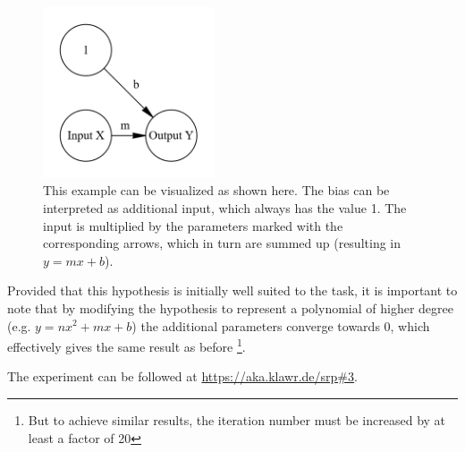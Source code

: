 \begin{figure}
    \centering
    \caption{This example can be visualized as shown here. The bias can be interpreted as additional input, which always has the value 1. The input is multiplied by the parameters marked with the corresponding arrows, which in turn are summed up (resulting in $y = mx + b$).}
    \includegraphics[width=0.45\textwidth]{images/1_simplest_nn.png}
\end{figure} 

Provided that this hypothesis is initially well suited to the task, it is important to note that by modifying the hypothesis to represent a polynomial of higher degree (e.g. $y = nx^2 + mx + b$) the additional parameters converge towards 0, which effectively gives the same result as before \footnote{But to achieve similar results, the iteration number must be increased by at least a factor of 20}.

The experiment can be followed at \url{https://aka.klawr.de/srp\#3}.
